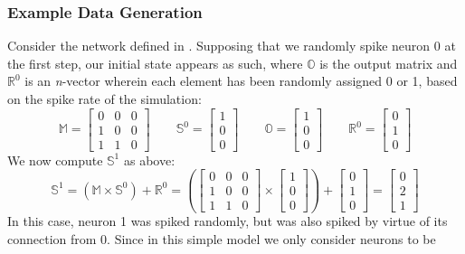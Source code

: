 \subsubsection{Example Data Generation}
Consider the network defined in . Supposing that we randomly 
spike neuron 0 at the first step, our initial state appears as such, where 
$\mathbb{O}$ is the output matrix and $\mathbb{R}^0$ is an \textit{n}-vector 
wherein each element has been randomly assigned 0 or 1, based on the spike rate 
of the simulation:
\[
	\mathbb{M} = \begin{bmatrix}
		0 & 0 & 0 \\
		1 & 0 & 0 \\
		1 & 1 & 0
	\end{bmatrix} \qquad
	\mathbb{S}^0 = \begin{bmatrix} 1 \\ 0 \\ 0 \end{bmatrix} \qquad
	\mathbb{O} = \begin{bmatrix} 1 \\ 0 \\ 0 \end{bmatrix} \qquad
	\mathbb{R}^0 = \begin{bmatrix} 0 \\ 1 \\ 0 \end{bmatrix}
\]
We now compute $\mathbb{S}^1$ as above:
\[
	\mathbb{S}^1 = (\mathbb{M} \times \mathbb{S}^0) + \mathbb{R}^0 = 
		\left(\begin{bmatrix}
		0 & 0 & 0 \\
		1 & 0 & 0 \\
		1 & 1 & 0
	\end{bmatrix} \times \begin{bmatrix} 1 \\ 0 \\ 0 \end{bmatrix}\right)
	+ \begin{bmatrix} 0 \\ 1 \\ 0 \end{bmatrix}
	= \begin{bmatrix} 0 \\ 2 \\ 1 \end{bmatrix}
\]
In this case, neuron 1 was spiked randomly, but was also spiked by virtue of its 
connection from 0. Since in this simple model we only consider neurons to be 
